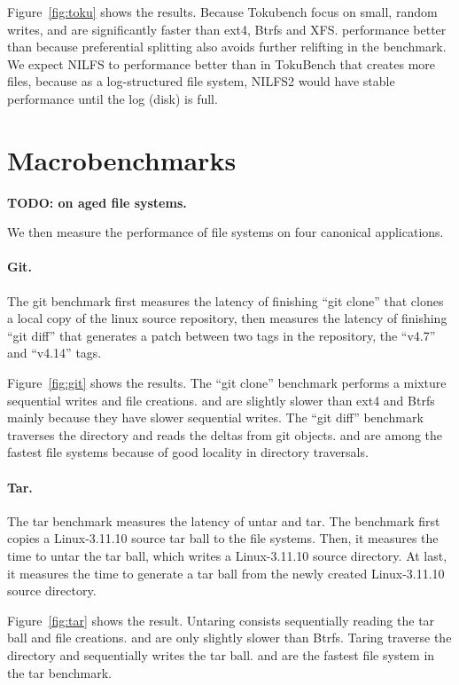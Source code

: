 Figure~\ref{fig:toku} shows the results.
Because Tokubench focus on small, random writes, \betrfsFour and \betrfsFive are
significantly faster than ext4, Btrfs and XFS.
\betrfsFive performance better than \betrfsFour because preferential splitting
also avoids further relifting in the benchmark.
We expect NILFS to performance better than \betrfsFive in TokuBench that creates
more files,
because as a log-structured file system, NILFS2 would have stable performance
until the log (disk) is full.

\section{Macrobenchmarks}

\textbf{TODO: on aged file systems.}

We then measure the performance of file systems on four canonical applications.

\paragraph{Git.}

The git benchmark first measures the latency of finishing ``git clone'' that
clones a local copy of the linux source repository,
then measures the latency of finishing ``git diff'' that generates a patch
between two tags in the repository, the ``v4.7'' and ``v4.14'' tags.

Figure~\ref{fig:git} shows the results.
The ``git clone'' benchmark performs a mixture sequential writes and file
creations.
\betrfsFour and \betrfsFive are slightly slower than ext4 and Btrfs mainly
because they have slower sequential writes.
The ``git diff'' benchmark traverses the directory and reads the deltas from git
objects.
\betrfsFour and \betrfsFive are among the fastest file systems because of good
locality in directory traversals.

\paragraph{Tar.}

The tar benchmark measures the latency of untar and tar.
The benchmark first copies a Linux-3.11.10 source tar ball to the file systems.
Then, it measures the time to untar the tar ball, which writes a Linux-3.11.10
source directory.
At last, it measures the time to generate a tar ball from the newly created
Linux-3.11.10 source directory.

Figure~\ref{fig:tar} shows the result.
Untaring consists sequentially reading the tar ball and file creations.
\betrfsFour and \betrfsFive are only slightly slower than Btrfs.
Taring traverse the directory and sequentially writes the tar ball.
\betrfsFour and \betrfsFive are the fastest file system in the tar benchmark.

